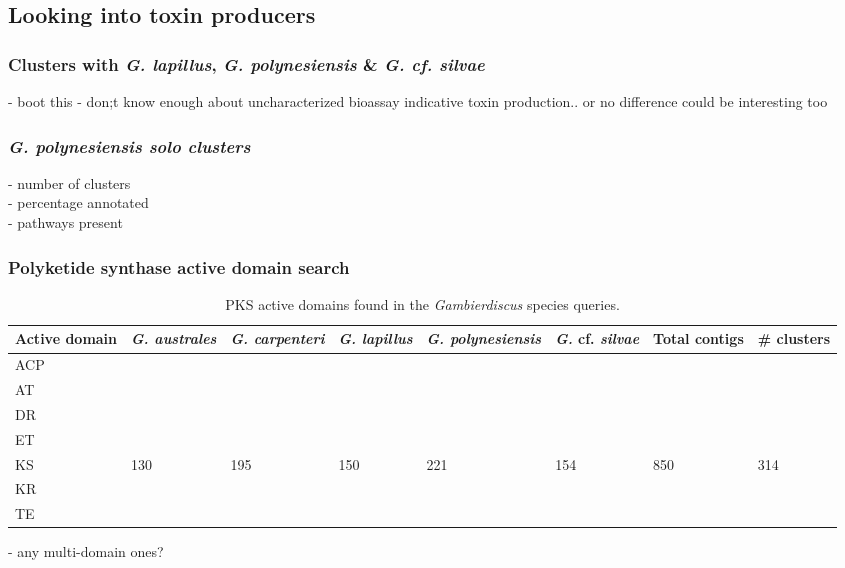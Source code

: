 \documentclass[12pt]{article}
\begin{document}
\subsection*{Looking into toxin producers}
\subsubsection*{Clusters with \textit{G. lapillus}, \textit{G. polynesiensis} \& \textit{G. cf. silvae}}
- boot this - don;t know enough about uncharacterized bioassay indicative toxin production.. or no difference could be interesting too

\subsubsection*{\textit{G. polynesiensis solo clusters}}
- number of clusters\\
- percentage annotated \\
- pathways present\\

\subsubsection*{Polyketide synthase active domain search}

\begin{table}
\caption{PKS active domains found in the \emph{Gambierdiscus} species queries.}
\label{tbl:PKSTable}
\begin{tabular}{ | p{1.65cm} | p{1.5cm} | p{1.5cm} | p{1.5cm} | p{1.7cm} | p{1.5cm}| p{1.5cm}| p{1.5cm}|}
\hline
\textbf{Active domain}& \textit{G. australes}& \emph{G. carpenteri}&\emph{G. lapillus}&\emph{G. polynesiensis}&\emph{G.} cf. \emph{silvae}&\textbf{Total contigs}&\textbf{\# clusters}\\
\hline
ACP&&&&&&&\\
\hline
AT&&&&&&&\\
\hline
DR&&&&&&&\\
\hline
ET&&&&&&&\\
\hline
KS&130&195&150&221&154&850&314\\
\hline
KR&&&&&&&\\
\hline
TE&&&&&&&\\
\hline
\end{tabular}
\end{table}
\FloatBarrier
- any multi-domain ones?\\
\end{document}
